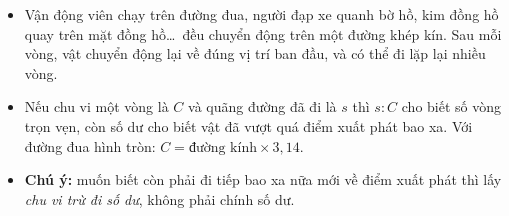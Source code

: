 \begin{knowbox}\begin{itemize}[leftmargin=1.4em,itemsep=3pt]
\item Vận động viên chạy trên đường đua, người đạp xe quanh bờ hồ, kim đồng hồ quay trên mặt đồng hồ\ldots\ đều chuyển động trên một đường khép kín. Sau mỗi vòng, vật chuyển động lại về đúng vị trí ban đầu, và có thể đi lặp lại nhiều vòng.
\item Nếu chu vi một vòng là $C$ và quãng đường đã đi là $s$ thì $s:C$ cho biết số vòng trọn vẹn, còn số dư cho biết vật đã vượt quá điểm xuất phát bao xa.
Với đường đua hình tròn: $C=\text{đường kính}\times3{,}14$.
\item \textbf{Chú ý:} muốn biết còn phải đi tiếp bao xa nữa mới về điểm xuất phát thì lấy \emph{chu vi trừ đi số dư}, không phải chính số dư.
\end{itemize}\end{knowbox}
\gap
{}
